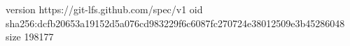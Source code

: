version https://git-lfs.github.com/spec/v1
oid sha256:dcfb20653a19152d5a076cd983229f6c6087fc270724e38012509e3b45286048
size 198177
